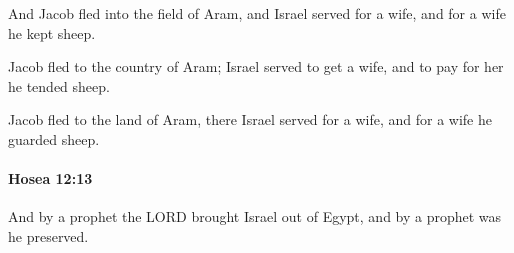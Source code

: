 			\begin{versebox}
					\item[BHS] 
					\item[LXX] 
					\item[ASV] And Jacob fled into the field of Aram, and Israel served for a wife, and for a wife he kept sheep.
					\item[NIV] Jacob fled to the country of Aram; Israel served to get a wife, and to pay for her he tended sheep.
					\item[NRSV] Jacob fled to the land of Aram, there Israel served for a wife, and for a wife he guarded sheep.
			\end{versebox}

		\paragraph{Hosea 12:13} %
			\label{HOSEA-12-13}

			And by a prophet the LORD brought Israel out of Egypt, and by a prophet was he preserved.

